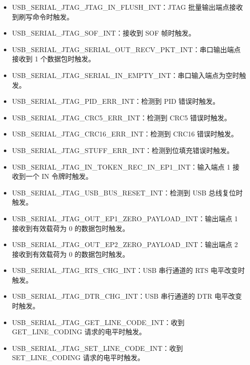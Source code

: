 \documentclass[main\_\_CN.tex]{subfiles}
\begin{document}
\begin{itemize}
\item \label{int:USBSERIALJTAGJTAGINFLUSHINT}USB\_SERIAL\_JTAG\_JTAG\_IN\_FLUSH\_INT：JTAG 批量输出端点接收到刷写命令时触发。
\item \label{int:USBSERIALJTAGSOFINT}USB\_SERIAL\_JTAG\_SOF\_INT：接收到 SOF 帧时触发。
\item \label{int:USBSERIALJTAGSERIALOUTRECVPKTINT}USB\_SERIAL\_JTAG\_SERIAL\_OUT\_RECV\_PKT\_INT：串口输出端点接收到 1 个数据包时触发。
\item \label{int:USBSERIALJTAGSERIALINEMPTYINT}USB\_SERIAL\_JTAG\_SERIAL\_IN\_EMPTY\_INT：串口输入端点为空时触发。
\item \label{int:USBSERIALJTAGPIDERRINT}USB\_SERIAL\_JTAG\_PID\_ERR\_INT：检测到 PID 错误时触发。
\item \label{int:USBSERIALJTAGCRC5ERRINT}USB\_SERIAL\_JTAG\_CRC5\_ERR\_INT：检测到 CRC5 错误时触发。
\item \label{int:USBSERIALJTAGCRC16ERRINT}USB\_SERIAL\_JTAG\_CRC16\_ERR\_INT：检测到 CRC16 错误时触发。
\item \label{int:USBSERIALJTAGSTUFFERRINT}USB\_SERIAL\_JTAG\_STUFF\_ERR\_INT：检测到位填充错误时触发。
\item \label{int:USBSERIALJTAGINTOKENRECINEP1INT}USB\_SERIAL\_JTAG\_IN\_TOKEN\_REC\_IN\_EP1\_INT：输入端点 1 接收到一个 IN 令牌时触发。
\item \label{int:USBSERIALJTAGUSBBUSRESETINT}USB\_SERIAL\_JTAG\_USB\_BUS\_RESET\_INT：检测到 USB 总线复位时触发。
\item \label{int:USBSERIALJTAGOUTEP1ZEROPAYLOADINT}USB\_SERIAL\_JTAG\_OUT\_EP1\_ZERO\_PAYLOAD\_INT：输出端点 1 接收到有效载荷为 0 的数据包时触发。
\item \label{int:USBSERIALJTAGOUTEP2ZEROPAYLOADINT}USB\_SERIAL\_JTAG\_OUT\_EP2\_ZERO\_PAYLOAD\_INT：输出端点 2 接收到有效载荷为 0 的数据包时触发。
\item \label{int:USBSERIALJTAGRTSCHGINT}USB\_SERIAL\_JTAG\_RTS\_CHG\_INT：USB 串行通道的 RTS 电平改变时触发。
\item \label{int:USBSERIALJTAGDTRCHGINT}USB\_SERIAL\_JTAG\_DTR\_CHG\_INT：USB 串行通道的 DTR 电平改变时触发。
\item \label{int:USBSERIALJTAGGETLINECODEINT}USB\_SERIAL\_JTAG\_GET\_LINE\_CODE\_INT：收到 GET\_LINE\_CODING 请求的电平时触发。
\item \label{int:USBSERIALJTAGSETLINECODEINT}USB\_SERIAL\_JTAG\_SET\_LINE\_CODE\_INT：收到 SET\_LINE\_CODING 请求的电平时触发。
\end{itemize}
\end{document}
